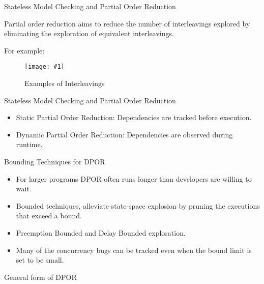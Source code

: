 \documentclass[9pt]{beamer}
\newcommand{\trace}[2]{
\begin{figure}[H]
\centering
\texttt{[image: \#1]}
\caption{#2}
\label{#2}
\end{figure}
}
\begin{document}
\begin{frame} {Stateless Model Checking and Partial Order Reduction}
 
    
Partial order reduction aims to reduce the number of interleavings explored by eliminating the exploration of
equivalent interleavings.

For example:
\trace{../img/interleavings}{Examples of Interleavings}

\end{frame}

\begin{frame}{Stateless Model Checking and Partial Order Reduction}

\begin{itemize}[<+->]
\item Static Partial Order Reduction: Dependencies are tracked before execution.

\item Dynamic Partial Order Reduction: Dependencies are observed during runtime.
\end{itemize}

\end{frame}

\begin{frame}{Bounding Techniques for DPOR}

\begin{itemize}[<+->]
\item For larger programs DPOR often runs longer than developers are willing to wait. 
\item Bounded techniques, alleviate state-space explosion by pruning the executions
that exceed a bound. 
\item Preemption Bounded and Delay Bounded exploration.
\item Many of the concurrency bugs can be tracked even when the bound limit is set to be small.
\end{itemize}
    
\end{frame}


\begin{frame}{General form of DPOR}
    
\begin{figure}
\centering
{}
\end{figure}

\end{frame}
\end{document}
